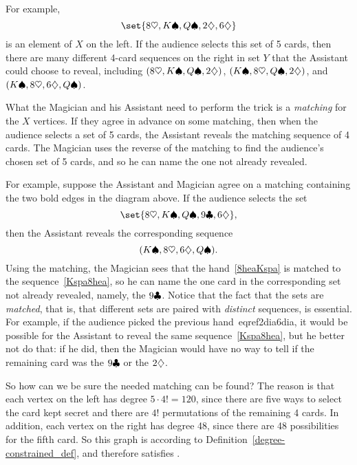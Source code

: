 For example,
\begin{equation}\label{2dia6dia}
\set{ 8 \hea, K \spa, Q \spa, 2 \dia, 6 \dia }
\end{equation}
is an element of $X$ on the left.  If the audience selects this set of 5
cards, then there are many different 4-card sequences on the right in set
$Y$ that the Assistant could choose to reveal, including $(8 \heartsuit, K \spadesuit,
Q \spadesuit, 2 \diamondsuit)$, $(K \spadesuit, 8 \heartsuit, Q \spadesuit, 2 \diamondsuit)$, and $(K \spadesuit, 8
\heartsuit, 6 \diamondsuit, Q \spadesuit)$.

What the Magician and his Assistant need to perform the trick is a
\emph{matching} for the $X$ vertices.  If they agree in advance on some
matching, then when the audience selects a set of 5 cards, the Assistant
reveals the matching sequence of 4 cards.  The Magician uses the reverse
of the matching to find the audience's chosen set of 5 cards, and so he
can name the one not already revealed.

For example, suppose the Assistant and Magician agree on a matching
containing the two bold edges in the diagram above.  If the audience
selects the set
\begin{equation}\label{8heaKspa}
\set{8 \hea, K \spa, Q \spa, 9 \clu, 6 \dia},
\end{equation}
then the Assistant reveals the corresponding sequence
\begin{equation}\label{Kspa8hea}
(K \spadesuit, 8 \heartsuit, 6 \diamondsuit, Q \spadesuit).
\end{equation}
Using the matching, the Magician sees that the hand~\eqref{8heaKspa} is
matched to the sequence~\eqref{Kspa8hea}, so he can name the one card in
the corresponding set not already revealed, namely, the $9 \clubsuit$.  Notice
that the fact that the sets are \emph{matched}, that is, that different
sets are paired with \emph{distinct} sequences, is essential.  For
example, if the audience picked the previous hand~eqref{2dia6dia}, it
would be possible for the Assistant to reveal the same
sequence~\eqref{Kspa8hea}, but he better not do that: if he did, then the
Magician would have no way to tell if the remaining card was the $9 \clubsuit$
or the $2 \diamondsuit$.

So how can we be sure the needed matching can be found?  The reason is
that each vertex on the left has degree $5 \cdot 4! = 120$, since there
are five ways to select the card kept secret and there are $4!$
permutations of the remaining 4 cards.  In addition, each vertex on the
right has degree 48, since there are 48 possibilities for the fifth card.
So this graph is \emph{} according to
Definition~\ref{degree-constrained_def}, and therefore satisfies .


